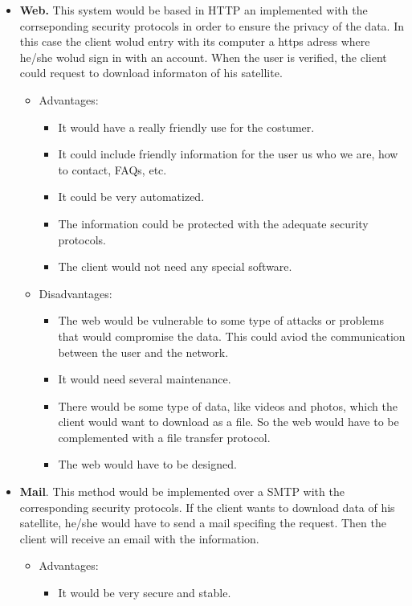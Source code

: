 \begin{itemize}
\item \textbf{Web.} This system would be based in HTTP an implemented with the corrseponding security protocols in order to ensure the privacy of the data. In this case the client wolud entry with its computer a https adress where he/she wolud sign in with an account. When the user is verified, the client could request to download informaton of his satellite. 
\begin{itemize}
\item Advantages: 
\begin{itemize}
\item It would have a really friendly use for the costumer.
\item It could include friendly information for the user us who we are, how to contact, FAQs, etc.
\item It could be very automatized.
\item The information could be protected with the adequate security protocols.
\item The client would not need any special software.
\end{itemize}
\item Disadvantages:
\begin{itemize}
\item The web would be vulnerable to some type of attacks or problems that would compromise the data. This could aviod the communication between the user and the network.
\item It would need several maintenance.
\item There would be some type of data, like videos and photos, which the client would want to download as a file. So the web would have to be complemented with a file transfer protocol.
\item The web would have to be designed.
\end{itemize}
\end{itemize}
\item \textbf{Mail}. This method would be implemented over a SMTP with the corresponding security protocols. If the client wants to download data of his satellite, he/she would have to send a mail specifing the request. Then the client will receive an email with the information.
\begin{itemize}
\item Advantages:
\begin{itemize}
\item It would be very secure and stable.

\end{itemize}
\end{itemize}
\end{itemize}
